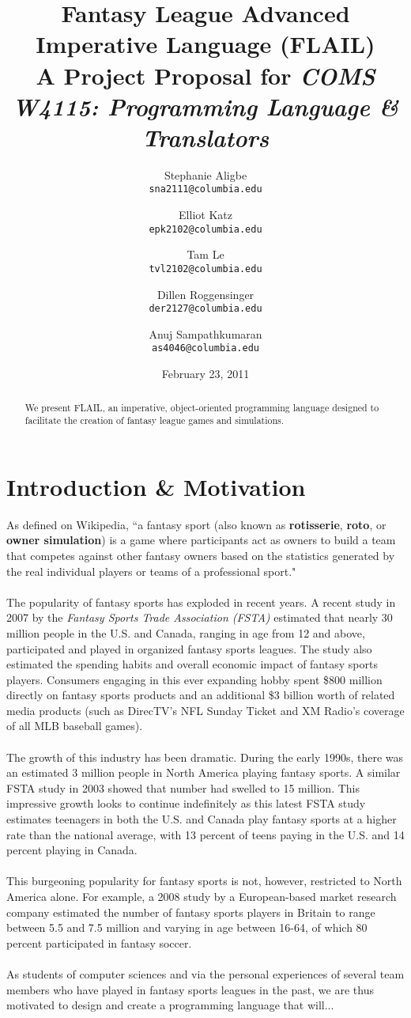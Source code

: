 \documentclass[12pt]{article}
\title{
{\bf Fantasy League Advanced\\
Imperative Language (FLAIL)}\\
{\small A Project Proposal for {\it COMS W4115: Programming Language \& Translators}}
}
\author{
	Stephanie Aligbe\\
	\texttt{\small{sna2111@columbia.edu}}
	\and
	Elliot Katz\\
	\texttt{\small{epk2102@columbia.edu}}
	\and
	Tam Le\\
	\texttt{\small{tvl2102@columbia.edu}}
	\and
	Dillen Roggensinger\\
	\texttt{\small{der2127@columbia.edu}}
	\and
	Anuj Sampathkumaran\\
	\texttt{\small{as4046@columbia.edu}}
}
\date{February 23, 2011}
\begin{document}
\maketitle

\begin{abstract}
We present FLAIL, an imperative, object-oriented programming language designed to facilitate the creation of fantasy league games and simulations. 
\begin{center}

\end{center}
\end{abstract}

\section{Introduction \& Motivation}
As defined on Wikipedia, ``a fantasy sport (also known as {\bf rotisserie}, {\bf roto}, or {\bf owner simulation}) is a game where participants act as owners to build a team that competes against other fantasy owners based on the statistics generated by the real individual players or teams of a professional sport."
\\\\
The popularity of fantasy sports has exploded in recent years. A recent study in 2007 by the {\it  Fantasy Sports Trade Association (FSTA)} estimated that nearly 30 million people in the U.S. and Canada, ranging in age from 12 and above, participated and played in organized fantasy sports leagues. The study also estimated the spending habits and overall economic impact of fantasy sports players. Consumers engaging in this ever expanding hobby spent \$800 million directly on fantasy sports products and an additional \$3 billion worth of related media products (such as DirecTV's NFL Sunday Ticket and XM Radio's coverage of all MLB baseball games).
\\\\
The growth of this industry has been dramatic. During the early 1990s, there was an estimated 3 million people in North America playing fantasy sports. A similar FSTA study in 2003 showed that number had swelled to 15 million. This impressive growth looks to continue indefinitely as this latest FSTA study estimates teenagers in both the U.S. and Canada play fantasy sports at a higher rate than the national average, with 13 percent of teens paying in the U.S. and 14 percent playing in Canada.
\\\\
This burgeoning popularity for fantasy sports is not, however, restricted to North America alone. For example, a 2008 study by a European-based market research company estimated the number of fantasy sports players in Britain to range between 5.5 and 7.5 million and varying in age between 16-64, of which 80 percent participated in fantasy soccer.
\\\\
As students of computer sciences and via the personal experiences of several team members who have played in fantasy sports leagues in the past, we are thus motivated to design and create a programming language that will...
\end{document}

